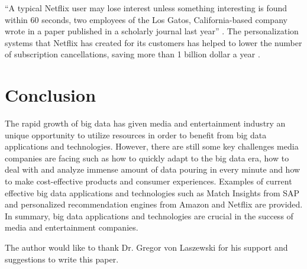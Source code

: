 \documentclass[sigconf]{acmart}
\begin{document}
``A typical Netflix user may lose interest unless something interesting is found within 60 seconds, two employees of the Los Gatos, California-based company wrote in a paper published in a scholarly journal last year''  \cite{Whitley2016data}. The personalization systems that Netflix has created for its customers has helped to lower the number of subscription cancellations, saving more than 1 billion dollar a year \cite{Whitley2016data}.

\section{Conclusion}

The rapid growth of big data has given media and entertainment industry an unique opportunity to utilize resources in order to benefit from big data applications and technologies. However, there are still some key challenges media companies are facing such as how to quickly adapt to the big data era, how to deal with and analyze immense amount of data pouring in every minute and how to make cost-effective products and consumer experiences. Examples of current effective big data applications and technologies such as Match Insights from SAP and personalized recommendation engines from Amazon and Netflix are provided. In summary, big data applications and technologies are crucial in the success of media and entertainment companies.

\begin{acks}

  The author would like to thank Dr. Gregor von Laszewski for his support and suggestions to write this paper.

\end{acks}


 
\end{document}
